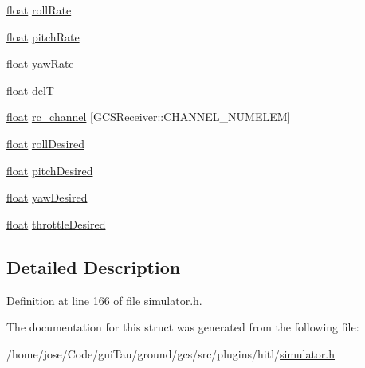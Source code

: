 \begin{DoxyCompactItemize}
\item 
\hyperlink{_super_l_u_support_8h_a6a1bb6ed41f44b60e7bd83b0e9945aa7}{float} \hyperlink{group___h_i_t_l_plugin_ga81680dc2663395de5b3f4aeaeb9f35f9}{roll\-Rate}
\item 
\hyperlink{_super_l_u_support_8h_a6a1bb6ed41f44b60e7bd83b0e9945aa7}{float} \hyperlink{group___h_i_t_l_plugin_ga9d3248d73390ba0b13ca165ee1f1fef0}{pitch\-Rate}
\item 
\hyperlink{_super_l_u_support_8h_a6a1bb6ed41f44b60e7bd83b0e9945aa7}{float} \hyperlink{group___h_i_t_l_plugin_gab54300de73ca6f11f519068435673210}{yaw\-Rate}
\item 
\hyperlink{_super_l_u_support_8h_a6a1bb6ed41f44b60e7bd83b0e9945aa7}{float} \hyperlink{group___h_i_t_l_plugin_gadbdb09f62a5ce0e914e8551ce3bd0bbd}{del\-T}
\item 
\hyperlink{_super_l_u_support_8h_a6a1bb6ed41f44b60e7bd83b0e9945aa7}{float} \hyperlink{group___h_i_t_l_plugin_gadf58977eef899196280267ae39cc6f65}{rc\-\_\-channel} \mbox{[}G\-C\-S\-Receiver\-::\-C\-H\-A\-N\-N\-E\-L\-\_\-\-N\-U\-M\-E\-L\-E\-M\mbox{]}
\item 
\hyperlink{_super_l_u_support_8h_a6a1bb6ed41f44b60e7bd83b0e9945aa7}{float} \hyperlink{group___h_i_t_l_plugin_ga56fde0222228b19a5ed9e89efd765da0}{roll\-Desired}
\item 
\hyperlink{_super_l_u_support_8h_a6a1bb6ed41f44b60e7bd83b0e9945aa7}{float} \hyperlink{group___h_i_t_l_plugin_ga29bbb9f720db0b7039f92a3afcb785a3}{pitch\-Desired}
\item 
\hyperlink{_super_l_u_support_8h_a6a1bb6ed41f44b60e7bd83b0e9945aa7}{float} \hyperlink{group___h_i_t_l_plugin_gaf01c33ffb5c7695348739d0070122bd7}{yaw\-Desired}
\item 
\hyperlink{_super_l_u_support_8h_a6a1bb6ed41f44b60e7bd83b0e9945aa7}{float} \hyperlink{group___h_i_t_l_plugin_gab6902f4f38e771b9d499521d861661f2}{throttle\-Desired}
\end{DoxyCompactItemize}


\subsection{Detailed Description}


Definition at line 166 of file simulator.\-h.



The documentation for this struct was generated from the following file\-:\begin{DoxyCompactItemize}
\item 
/home/jose/\-Code/gui\-Tau/ground/gcs/src/plugins/hitl/\hyperlink{simulator_8h}{simulator.\-h}\end{DoxyCompactItemize}
